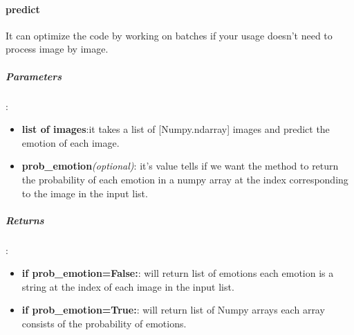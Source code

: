 \begin{comment}
\subparagraph{Usage:}
\begin{changemargin}{0.5cm}{0cm}
\begin{itemize}
\item import the module:
\begin{lstlisting}[language=Python]
from model.emotions_model import *\end{lstlisting}

\item create new object:
\begin{lstlisting}[language=Python]
model = EmotionsModel(
		verbose=False,
		create_new=False,
		use_hog=None,
		use_cnn=None,
		use_lm=None,
		emotions=None
)\end{lstlisting}

\end{itemize}
\end{changemargin}
\end{comment}

\paragraph{predict}It can optimize the code by working on batches if your usage doesn't need to process image by image.

\subparagraph{Parameters}:
\begin{changemargin}{0.5cm}{0cm}
\begin{itemize}
	\item \textbf{list of images}:it takes a list of [Numpy.ndarray] images and predict the emotion of each image.
	\item \textbf{prob\_emotion}\textit{(optional)}: it's value tells if we want the method to return the probability of each emotion in a numpy array at the index corresponding to the image in the input list. 
\end{itemize}
\end{changemargin}

\subparagraph{Returns}:
\begin{changemargin}{0.5cm}{0cm}
\begin{itemize}[nolistsep]
	\item \textbf{if prob\_emotion=False:}:\newline
	will return list of emotions each emotion is a string at the index of each image in the input list.
	\item \textbf{if prob\_emotion=True:}:\newline
	will return list of Numpy arrays each array consists of the probability of emotions.
\end{itemize}
\end{changemargin}


